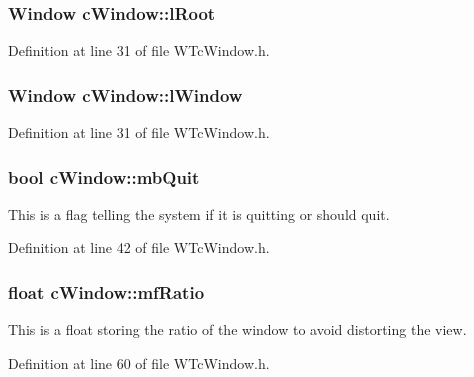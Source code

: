 \hypertarget{classc_window_a38f6eae4c48516c8528bbcd121401281}{
\subsubsection[{lRoot}]{\setlength{\rightskip}{0pt plus 5cm}Window {\bf cWindow::lRoot}}}
\label{classc_window_a38f6eae4c48516c8528bbcd121401281}


Definition at line 31 of file WTcWindow.h.

\hypertarget{classc_window_a56887fef3b2681690454e823ce0c7f00}{
\subsubsection[{lWindow}]{\setlength{\rightskip}{0pt plus 5cm}Window {\bf cWindow::lWindow}}}
\label{classc_window_a56887fef3b2681690454e823ce0c7f00}


Definition at line 31 of file WTcWindow.h.

\hypertarget{classc_window_a30b82d1c8cbe509a8c65143aba4a268d}{
\subsubsection[{mbQuit}]{\setlength{\rightskip}{0pt plus 5cm}bool {\bf cWindow::mbQuit}}}
\label{classc_window_a30b82d1c8cbe509a8c65143aba4a268d}


This is a flag telling the system if it is quitting or should quit. 



Definition at line 42 of file WTcWindow.h.

\hypertarget{classc_window_ab13b4b341110b53959a17092d5a415da}{
\subsubsection[{mfRatio}]{\setlength{\rightskip}{0pt plus 5cm}float {\bf cWindow::mfRatio}}}
\label{classc_window_ab13b4b341110b53959a17092d5a415da}


This is a float storing the ratio of the window to avoid distorting the view. 



Definition at line 60 of file WTcWindow.h.

